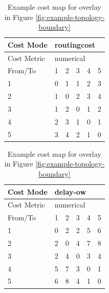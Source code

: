 \begin{table}[H]
    \centering
    \begin{subtable}{.4\linewidth}
        \centering
        \begin{tabular}{|l|l|l|l|l|l|}
        \hline
        Cost Mode   & \multicolumn{5}{|l|}{routingcost} \\ \hline
        Cost Metric & \multicolumn{5}{|l|}{numerical}   \\ \hline
        From/To     & 1    & 2     & 3   & 4   & 5      \\ \hline
        1           & 0    & 1     & 1   & 2   & 3      \\ \hline
        2           & 1    & 0     & 2   & 3   & 4      \\ \hline
        3           & 1    & 2     & 0   & 1   & 2      \\ \hline
        4           & 2    & 3     & 1   & 0   & 1      \\ \hline
        5           & 3    & 4     & 2   & 1   & 0      \\ \hline
        \end{tabular}
    \caption{Routing cost cost matrix}
    \end{subtable}
    \begin{subtable}{.4\linewidth}
        \centering
        \begin{tabular}{|l|l|l|l|l|l|}
        \hline
        Cost Mode   & \multicolumn{5}{|l|}{delay-ow}    \\ \hline
        Cost Metric & \multicolumn{5}{|l|}{numerical}   \\ \hline
        From/To     & 1    & 2     & 3   & 4   & 5      \\ \hline
        1           & 0    & 2     & 2   & 5   & 6      \\ \hline
        2           & 2    & 0     & 4   & 7   & 8      \\ \hline
        3           & 2    & 4     & 0   & 3   & 4      \\ \hline
        4           & 5    & 7     & 3   & 0   & 1      \\ \hline
        5           & 6    & 8     & 4   & 1   & 0      \\ \hline
        \end{tabular}
    \caption{One way packet delay cost matrix}
    \end{subtable}

    \caption{Example cost map for overlay in Figure \ref{fig:example-topology-boundary}}
    \label{table:costmap-example-non-boundary}
\end{table}

